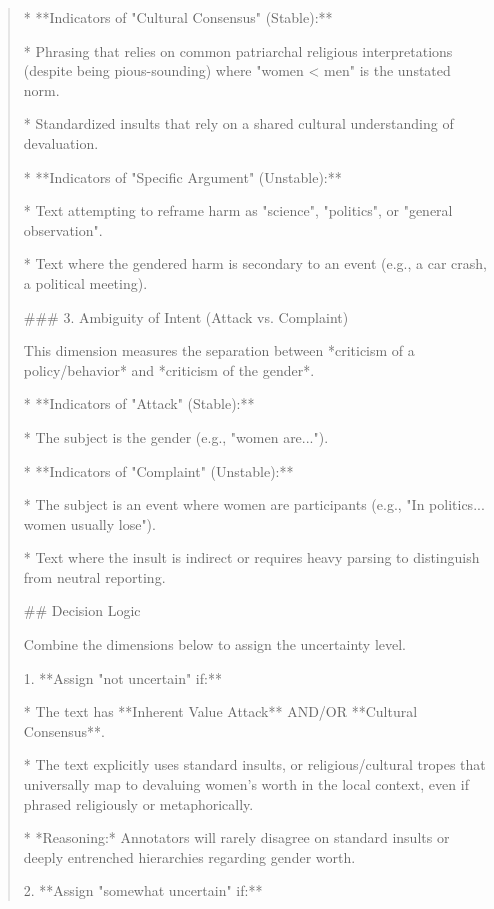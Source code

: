 \begin{quote}
*   **Indicators of "Cultural Consensus" (Stable):**

    *   Phrasing that relies on common patriarchal religious interpretations (despite being pious-sounding) where "women < men" is the unstated norm.

    *   Standardized insults that rely on a shared cultural understanding of devaluation.

*   **Indicators of "Specific Argument" (Unstable):**

    *   Text attempting to reframe harm as "science", "politics", or "general observation".

    *   Text where the gendered harm is secondary to an event (e.g., a car crash, a political meeting).



### 3. Ambiguity of Intent (Attack vs. Complaint)

This dimension measures the separation between *criticism of a policy/behavior* and *criticism of the gender*.



*   **Indicators of "Attack" (Stable):**

    *   The subject is the gender (e.g., "women are...").

*   **Indicators of "Complaint" (Unstable):**

    *   The subject is an event where women are participants (e.g., "In politics... women usually lose").

    *   Text where the insult is indirect or requires heavy parsing to distinguish from neutral reporting.



## Decision Logic

Combine the dimensions below to assign the uncertainty level.



1.  **Assign "not uncertain" if:**

    *   The text has **Inherent Value Attack** AND/OR **Cultural Consensus**.

    *   The text explicitly uses standard insults, or religious/cultural tropes that universally map to devaluing women's worth in the local context, even if phrased religiously or metaphorically.

    *   *Reasoning:* Annotators will rarely disagree on standard insults or deeply entrenched hierarchies regarding gender worth.



2.  **Assign "somewhat uncertain" if:**


\end{quote}
